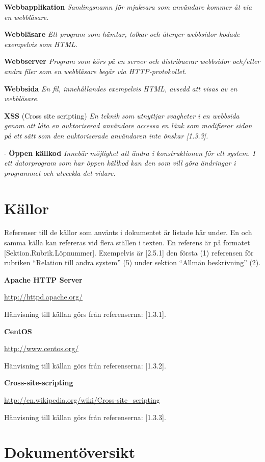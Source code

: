 \documentclass[a4paper, twoside, 11pt, titlepage]{article}
\begin{document}
	\textbf{Webbapplikation} \emph{Samlingsnamn för mjukvara som användare kommer åt via en webbläsare.}

	\textbf{Webbläsare} \emph{Ett program som hämtar, tolkar och återger webbsidor kodade exempelvis som HTML.}

	\textbf{Webbserver} \emph{Program som körs på en server och distribuerar webbsidor och/eller andra filer som en webbläsare begär via HTTP-protokollet.}

	\textbf{Webbsida} \emph{En fil, innehållandes exempelvis HTML, avsedd att visas av en webbläsare.}

	\textbf{XSS} (Cross site scripting) \emph{En teknik som utnyttjar svagheter i en webbsida genom att låta en auktoriserad användare accessa en länk som modifierar sidan på ett sätt som den auktoriserade användaren inte önskar [1.3.3].}

	- \textbf{Öppen källkod} \emph{Innebär möjlighet att ändra i konstruktionen för ett system. I ett datorprogram som har öppen källkod kan den som vill göra ändringar i programmet och utveckla det vidare.}

\clearpage
\section{Källor}


Referenser till de källor som använts i dokumentet är listade här under. En och samma källa kan refereras vid flera ställen i texten. En referens är på formatet [Sektion.Rubrik.Löpnummer]. Exempelvis är [2.5.1] den första (1) referensen för rubriken ``Relation till andra system'' (5) under sektion ``Allmän beskrivning'' (2).

\textbf{Apache HTTP Server}

\url{http://httpd.apache.org/}

Hänvisning till källan görs från referenserna: [1.3.1].

\textbf{CentOS}

\url{http://www.centos.org/}

Hänvisning till källan görs från referenserna: [1.3.2].

\textbf{Cross-site-scripting}

\url{http://en.wikipedia.org/wiki/Cross-site_scripting}

Hänvisning till källan görs från referenserna: [1.3.3].

\clearpage
\section{Dokumentöversikt}
\end{document}

